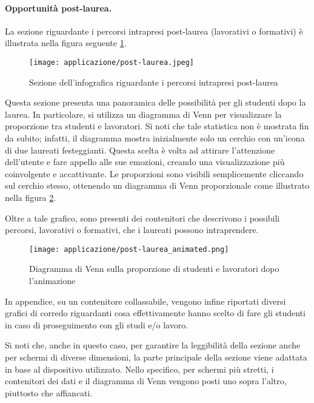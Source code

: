 \paragraph{Opportunità post-laurea.} La sezione riguardante i percorsi intrapresi post-laurea (lavorativi o formativi) è illustrata nella figura seguente \ref{fig:app_post-laurea}. 
\begin{figure}[H] 
    \centering 
    \texttt{[image: applicazione/post-laurea.jpeg]} 
    \caption{Sezione dell'infografica riguardante i percorsi intrapresi post-laurea}
    \label{fig:app_post-laurea}
\end{figure}
\noindent Questa sezione presenta una panoramica delle possibilità per gli studenti dopo la laurea. In particolare, si utilizza un diagramma di Venn per visualizzare la 
proporzione tra studenti e lavoratori. 
Si noti che tale statistica non è mostrata fin da subito; infatti, il diagramma mostra inizialmente solo un cerchio con un'icona di due laureati festeggianti.
Questa scelta è volta ad attirare l'attenzione dell'utente e fare appello alle sue emozioni, creando una visualizzazione più coinvolgente e accattivante. 
Le proporzioni sono visibili semplicemente cliccando sul cerchio stesso, ottenendo un diagramma di Venn proporzionale come illustrato nella figura 
\ref{fig:app_post-laurea_animated}. 

Oltre a tale grafico, sono presenti dei contenitori che descrivono i possibili percorsi, lavorativi o formativi, che i laureati possono intraprendere.
\begin{figure}[H] 
    \centering 
    \texttt{[image: applicazione/post-laurea\_animated.png]} 
    \caption{Diagramma di Venn sulla proporzione di studenti e lavoratori dopo l'animazione}
    \label{fig:app_post-laurea_animated}
\end{figure}

In appendice, su un contenitore collassabile, vengono infine riportati diversi grafici di corredo riguardanti cosa effettivamente hanno scelto di fare gli studenti in caso 
di proseguimento con gli studi e/o lavoro.

\bigskip
\noindent Si noti che, anche in questo caso, per garantire la leggibilità della sezione anche per schermi di diverse dimensioni, la parte principale della sezione viene adattata 
in base al dispositivo utilizzato. Nello specifico, per schermi più stretti, i contenitori dei dati e il diagramma di Venn vengono posti uno sopra l'altro, piuttosto che affiancati.

